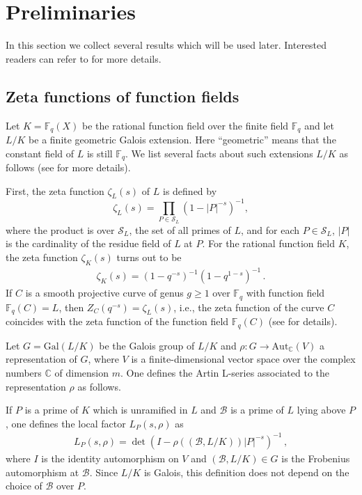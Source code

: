 \documentclass[12pt]{amsart}
\theoremstyle{plain}
\newcommand{\CC}{{\mathbb C}}
\newcommand{\F}{{\mathbb F}_q}
\begin{document}

\section{Preliminaries}
In this section we collect several results which will be used later. Interested readers can refer to \cite{ros} for more details.

\subsection{Zeta functions of function fields}

Let $K=\F(X)$ be the rational function field over the finite field $\F$ and let $L/K$ be a finite geometric Galois extension. Here ``geometric'' means that the constant field of $L$ is still $\F$. We list several facts about such extensions $L/K$ as follows (see \cite[Chapter 9]{ros} for more details).

First, the zeta function $\zeta_L(s)$ of $L$ is defined by
\[\zeta_L(s)=\prod_{P \in \mathcal{S}_L} \left(1-|P|^{-s}\right)^{-1},\]
where the product is over $\mathcal{S}_L$, the set of all primes of $L$, and for each $P \in \mathcal{S}_L$, $|P|$ is the cardinality of the residue field of $L$ at $P$. For the rational function field $K$, the zeta function $\zeta_K(s)$ turns out to be
\begin{eqnarray*}  \zeta_K(s)= \left(1-q^{-s}\right)^{-1} \left(1-q^{1-s}\right)^{-1}\,.\end{eqnarray*}
If $C$ is a smooth projective curve of genus $g \ge 1$ over $\F$ with function field $\F(C)=L$, then $Z_{C} \left(q^{-s}\right)=\zeta_L(s)$, i.e., the zeta function of the curve $C$ coincides with the zeta function of the function field $\F(C)$ (see \cite[pp. 57, Chap 5]{ros} for details).

Let $G=\mathrm{Gal}(L/K)$ be the Galois group of $L/K$ and $\rho: G \to \mathrm{Aut}_{\CC}(V)$ a representation of $G$, where $V$ is a finite-dimensional vector space over the complex numbers $\CC$ of dimension $m$. One defines the Artin L-series associated to the representation $\rho$ as follows.

If $P$ is a prime of $K$ which is unramified in $L$ and $\mathcal{B}$ is a prime of $L$ lying above $P$, one defines the local factor $L_P(s,\rho)$ as
\begin{eqnarray} \label{2:lf}L_P(s,\rho)=\det \left(I-\rho((\mathcal{B},L/K))|P|^{-s}\right)^{-1}\,,\end{eqnarray}
where $I$ is the identity automorphism on $V$ and $(\mathcal{B},L/K) \in G$ is the Frobenius automorphism at $\mathcal{B}$. Since $L/K$ is Galois, this definition does not depend on the choice of $\mathcal{B}$ over $P$.
\end{document}
